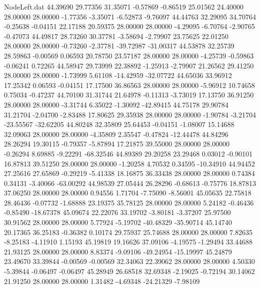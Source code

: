 \begin{filecontents}{NodeLeft.dat}
  44.39690   29.77356   31.35071    -0.57869   -0.86519   25.01562   24.40000   28.00000   28.00000   -1.77356   -3.35071   -6.52873   -9.76097
  44.44763   32.29095   34.70764    -0.25638   -0.04151   22.17188   20.59375   28.00000   28.00000   -4.29095   -6.70764   -2.90765   -0.47073
  44.49817   28.73260   30.37781    -3.58694   -2.79907   23.75625   22.01250   28.00000   28.00000   -0.73260   -2.37781  -39.72987  -31.00317
  44.53878   32.25739   28.59863    -0.00569    0.06593   20.78750   23.57187   28.00000   28.00000   -4.25739   -0.59863   -0.06241    0.72265
  44.58947   29.73999   22.38892    -1.25913   -2.79907   21.26562   29.41250   28.00000   28.00000   -1.73999    5.61108  -14.42959  -32.07722
  44.65036   33.96912   17.25342     0.06593   -0.04151   17.17500   36.86563   28.00000   28.00000   -5.96912   10.74658    0.75034   -0.47237
  44.70100   31.31744   21.64978    -0.11313   -3.73019   17.13750   36.91250   28.00000   28.00000   -3.31744    6.35022   -1.30092  -42.89415
  44.75178   29.90784   31.21704    -2.04700   -2.83488   17.80625   29.35938   28.00000   28.00000   -1.90784   -3.21704  -23.55567  -32.62205
  44.80248   32.35809   25.64453    -0.04151   -1.08007   15.14688   32.09063   28.00000   28.00000   -4.35809    2.35547   -0.47824  -12.44478
  44.84296   28.26294   19.30115    -0.79357   -5.87894   17.21875   39.55000   28.00000   28.00000   -0.26294    8.69885   -9.22291  -68.32546
  44.89389   29.20258   23.29468     0.03012   -0.90101   16.87813   39.51250   28.00000   28.00000   -1.20258    4.70532    0.34595  -10.34910
  44.94452   27.25616   27.65869    -0.29219   -5.41338   18.16875   36.33438   28.00000   28.00000    0.74384    0.34131   -3.40066  -63.00292
  44.98539   27.05444   26.28296    -0.68613   -0.75776   18.87813   37.06250   28.00000   28.00000    0.94556    1.71704   -7.75090   -8.56001
  45.05635   22.75818   28.46436    -0.07732   -1.68888   23.19375   35.78125   28.00000   28.00000    5.24182   -0.46436   -0.85490  -18.67378
  45.09674   22.22076   33.19702    -3.80181   -3.37207   25.97500   30.91562   28.00000   28.00000    5.77924   -5.19702  -40.48329  -35.90714
  45.14740   20.17365   36.25183    -0.36382    0.10174   29.75937   25.74688   28.00000   28.00000    7.82635   -8.25183   -4.11910    1.15193
  45.19819   19.16626   37.09106    -4.19575   -1.29494   33.44688   21.93125   28.00000   28.00000    8.83374   -9.09106  -49.24954  -15.19997
  45.24879   23.49670   33.39844    -0.00569   -0.00569   32.34063   22.39062   28.00000   28.00000    4.50330   -5.39844   -0.06497   -0.06497
  45.28949   26.68518   32.69348    -2.19025   -0.72194   30.14062   21.91250   28.00000   28.00000    1.31482   -4.69348  -24.21329   -7.98109

\end{filecontents}
